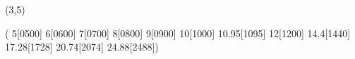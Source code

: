 %
%
%
%
%
%
%

\lhvercheck(3,5)

%
     \tablevalues       ( 5[0500] 6[0600] 7[0700] 8[0800] 9[0900]
                          10[1000] 10.95[1095] 12[1200] 14.4[1440]
                          17.28[1728] 20.74[2074] 24.88[2488])

